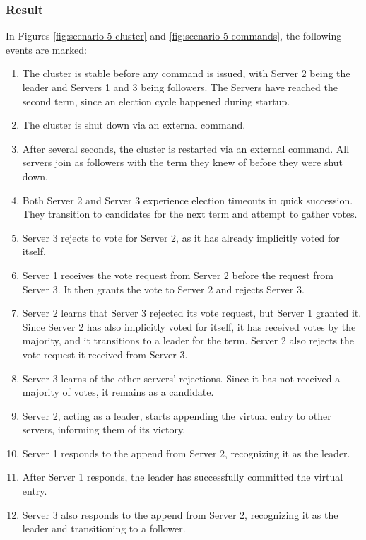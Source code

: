 \subsubsection{Result}

In Figures \ref{fig:scenario-5-cluster} and \ref{fig:scenario-5-commands}, the following events are marked:
\begin{enumerate}
    \item The cluster is stable before any command is issued, with Server 2 being the leader and Servers 1 and 3 being followers. The Servers have reached the second term, since an election cycle happened during startup.
    \item The cluster is shut down via an external command.
    \item After several seconds, the cluster is restarted via an external command. All servers join as followers with the term they knew of before they were shut down.
    \item Both Server 2 and Server 3 experience election timeouts in quick succession. They transition to candidates for the next term and attempt to gather votes.
    \item Server 3 rejects to vote for Server 2, as it has already implicitly voted for itself.
    \item Server 1 receives the vote request from Server 2 before the request from Server 3. It then grants the vote to Server 2 and rejects Server 3.
    \item Server 2 learns that Server 3 rejected its vote request, but Server 1 granted it. Since Server 2 has also implicitly voted for itself, it has received votes by the majority, and it transitions to a leader for the term. Server 2 also rejects the vote request it received from Server 3.
    \item Server 3 learns of the other servers' rejections. Since it has not received a majority of votes, it remains as a candidate.
    \item Server 2, acting as a leader, starts appending the virtual entry to other servers, informing them of its victory.
    \item Server 1 responds to the append from Server 2, recognizing it as the leader.
    \item After Server 1 responds, the leader has successfully committed the virtual entry.
    \item Server 3 also responds to the append from Server 2, recognizing it as the leader and transitioning to a follower.
\end{enumerate}

